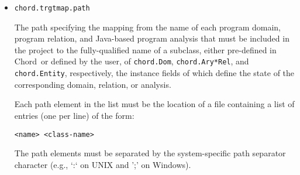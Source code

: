 \documentclass{article}
\providecommand\Chord{{Chord}}
\begin{document}
\begin{itemize}
The path specifying the mapping from the name of each program domain, program relation,
and Java-based program analysis that must be included in the project to the
fully-qualified name of a subclass, either pre-defined in \Chord\ or defined by the user, of
{\tt chord.Dom}, {\tt chord.Ary*Rel}, and {\tt chord.Entity}, respectively, which
define the following instance methods:
\begin{itemize}
\item
the {\tt execute} method specifying
the computation that updates the state of the corresponding domain, relation,
or analysis, 
\item
the {\tt invalidate} method specifying the action to be taken when the
state of the corresponding domain, relation, or analysis is invalidated.
\item
the {\tt getConsumedNames} method specifying names of any domains, relations,
and analyses upon whose state the computation depends, and
\item
the {\tt getProducedNames} method specifying names of any domains, relations,
and analyses whose state depends upon the computation.
\end{itemize}

Each path element must be the location of a file containing a
list of entries (one per line) of the form:

{\tt <name> <class-name>}

The path elements must be separated by the system-specific path separator character
(e.g., `:' on UNIX and `;' on Windows).

\item
{\tt chord.trgtmap.path}

The path specifying the mapping from the name of each program domain,
program relation, and Java-based program analysis that must be
included in the project to the fully-qualified name of a subclass,
either pre-defined in \Chord\ or defined by the user, of {\tt chord.Dom},
{\tt chord.Ary*Rel}, and
{\tt chord.Entity}, respectively, the instance fields of which define the
state of the corresponding domain, relation, or analysis.

Each path element in the list must be the location of a file containing a
list of entries (one per line) of the form:

{\tt <name> <class-name>}

The path elements must be separated by the system-specific path separator character
(e.g., `:` on UNIX and ';' on Windows).


\end{itemize}
\end{document}

